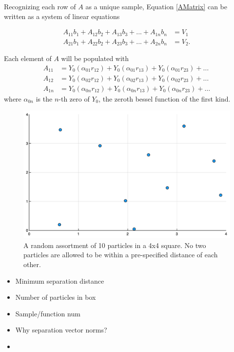 \par Recognizing each row of $A$ as a unique sample, Equation \ref{AMatrix} can be written as a system of linear equations

\begin{align}
A_{11}b_1 + A_{12}b_2 + A_{13}b_3 + ... + A_{1n}b_n &= V_1 \\
A_{21}b_1 + A_{22}b_2 + A_{23}b_3 + ... + A_{2n}b_n &= V_2.
\end{align}

\par Each element of $A$ will be populated with
\begin{align}
A_{11} &= Y_0(\alpha_{01} r_{12}) + Y_0(\alpha_{01} r_{13}) + Y_0(\alpha_{01} r_{23}) + \ldots \\
A_{12} &= Y_0(\alpha_{02} r_{12}) + Y_0(\alpha_{02} r_{13}) + Y_0(\alpha_{02} r_{23}) + \ldots  \\
A_{1n} &= Y_0(\alpha_{0n} r_{12}) + Y_0(\alpha_{0n} r_{13}) + Y_0(\alpha_{0n} r_{23}) + \ldots
\end{align}
where $\alpha_{0n}$ is the $n$-th zero of $Y_0$, the zeroth bessel function of the first kind.

\begin{figure}[h]
\includegraphics[scale = 0.3]{Figures/tenParticles}
\caption{A random assortment of 10 particles in a 4x4 square. No two particles are allowed to be within a pre-specified distance of each other. 
\label{tenParticles}} 
\end{figure}

\begin{itemize}
\item Minimum separation distance
\item Number of particles in box
\item Sample/function num
\item Why separation vector norms?
\item 
\end{itemize}





